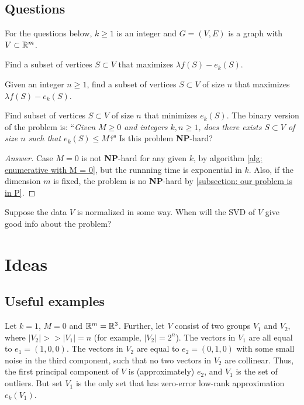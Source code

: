 \documentclass{article}
\begin{document}
\subsection{Questions}
For the questions below, $k \geq 1$ is an integer and $G = (V,E)$ is a graph with $V\subset \mathbb{R}^m$.
\begin{question}
    Find a subset of vertices $S\subset V$ that maximizes $\lambda f(S) - e_k(S)$.
\end{question}

\begin{question}
    Given an integer $n\geq 1$, find a subset of vertices $S\subset V$ of size $n$ that maximizes $\lambda f(S) - e_k(S)$.
\end{question}

\begin{question}\label{problem: no density}
    Find subset of vertices $S\subset V$ of size $n$ that minimizes $e_k(S)$. The binary version of the problem is: ``\textit{Given $M \geq 0$ and integers $k,n\geq 1$, does there exists  $S\subset V$ of size $n$ such that $e_k(S)\leq M$?}" Is this problem \textbf{NP}-hard?
\end{question}

\begin{proof}[Answer]
Case $M=0$ is not \textbf{NP}-hard for any given $k$, by algorithm \ref{alg: enumerative with M = 0}, but the runnning time is exponential in $k$. Also, if the dimension $m$ is fixed, the problem is no \textbf{NP}-hard by \ref{subsection: our problem is in P}.
\end{proof}

\begin{question}
    Suppose the data $V$ is normalized in some way. When will the SVD of $V$ give good info about the problem?
\end{question}

\section{Ideas}

\subsection{Useful examples}
Let $k = 1$, $M = 0$ and $\mathbb{R}^m = \mathbb{R}^3$. Further, let $V$ consist of two groups $V_1$ and $V_2$, where $|V_2| >> |V_1| = n$ (for example, $|V_2|=2^n$). The vectors in $V_1$ are all equal to $e_1 = (1,0,0)$. The vectors in $V_2$ are equal to $e_2=(0,1,0)$ with some small noise in the third component, such that no two vectors in $V_2$ are collinear. Thus, the first principal component of $V$ is (approximately) $e_2$, and $V_1$ is the set of outliers. But set $V_1$ is the only set that has zero-error low-rank approximation $e_k(V_1)$.
\end{document}
